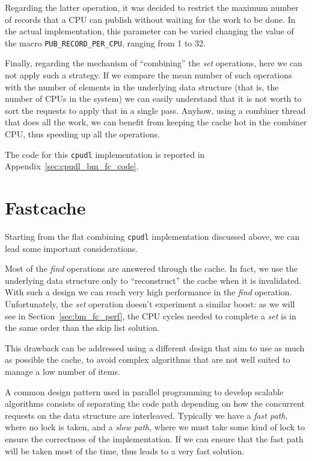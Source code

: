 Regarding the latter operation, it was decided to restrict the maximum number of records
that a CPU can publish without waiting for the work to be done. In the actual 
implementation, this parameter can be varied changing the value of the macro 
\texttt{PUB\_RECORD\_PER\_CPU}, ranging from 1 to 32.

Finally, regarding the mechanism of ``combining'' the \emph{set} operations, here we can not
apply such a strategy. If we compare the mean number of such operations with the
number of elements in the underlying data structure (that is, the number of
CPUs in the system) we can easily understand that it is not worth to sort the 
requests to apply that in a single pass. Anyhow, using a combiner thread that
does all the work, we can benefit from keeping the cache hot in the combiner CPU, 
thus speeding up all the operations.

The code for this \texttt{cpudl} implementation is reported in
Appendix~\ref{sec:cpudl_bm_fc_code}.

\section{Fastcache\label{sec:Fastcache}}

Starting from the flat combining \texttt{cpudl} implementation discussed above, we 
can lead some important considerations.

Most of the \emph{find} operations are answered through the cache. In fact, we
use the underlying data structure only to ``reconstruct'' the cache when it is
invalidated. With such a design we can reach very high performance in the \emph{find}
operation. Unfortunately, the \emph{set} operation doesn't experiment a
similar boost: as we will see in Section~\ref{sec:bm_fc_perf}, the CPU cycles needed to complete
a \emph{set} is in the same order than the skip list solution.

This drawback can be addressed using a different design that aim to use as much as
possible the cache, to avoid complex algorithms that are not well suited to manage
a low number of items.

A common design pattern used in parallel programming to develop scalable algorithms
consists of separating the code path depending on how the concurrent requests on 
the data structure are interleaved. Typically we have a \emph{fast path}, where no lock
is taken, and a \emph{slow path}, where we must take some kind of lock to ensure the
correctness of the implementation. If we can ensure that the fast path will be
taken most of the time, thus leads to a very fast solution.

